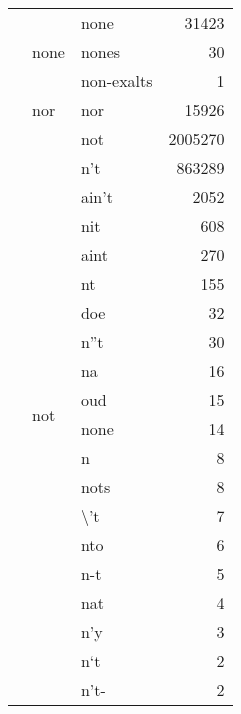 \begin{longtable}[ht]{lllr}
\cline{2-4}
 & \multirow[c]{3}{*}{none} & none & {\cellcolor[HTML]{FDFED4}} \color[HTML]{000000} 31423 \\
 &  & nones & {\cellcolor[HTML]{FFFFD9}} \color[HTML]{000000} 30 \\
 &  & non-exalts & {\cellcolor[HTML]{FFFFD9}} \color[HTML]{000000} 1 \\
\cline{2-4}
 & nor & nor & {\cellcolor[HTML]{FEFFD6}} \color[HTML]{000000} 15926 \\
\cline{2-4}
 & \multirow[c]{30}{*}{not} & not & {\cellcolor[HTML]{081D58}} \color[HTML]{F1F1F1} 2005270 \\
 &  & n't & {\cellcolor[HTML]{63C3BF}} \color[HTML]{000000} 863289 \\
 &  & ain't & {\cellcolor[HTML]{FFFFD9}} \color[HTML]{000000} 2052 \\
 &  & nit & {\cellcolor[HTML]{FFFFD9}} \color[HTML]{000000} 608 \\
 &  & aint & {\cellcolor[HTML]{FFFFD9}} \color[HTML]{000000} 270 \\
 &  & nt & {\cellcolor[HTML]{FFFFD9}} \color[HTML]{000000} 155 \\
 &  & doe & {\cellcolor[HTML]{FFFFD9}} \color[HTML]{000000} 32 \\
 &  & n''t & {\cellcolor[HTML]{FFFFD9}} \color[HTML]{000000} 30 \\
 &  & na & {\cellcolor[HTML]{FFFFD9}} \color[HTML]{000000} 16 \\
 &  & oud & {\cellcolor[HTML]{FFFFD9}} \color[HTML]{000000} 15 \\
 &  & none & {\cellcolor[HTML]{FFFFD9}} \color[HTML]{000000} 14 \\
 &  & n & {\cellcolor[HTML]{FFFFD9}} \color[HTML]{000000} 8 \\
 &  & nots & {\cellcolor[HTML]{FFFFD9}} \color[HTML]{000000} 8 \\
 &  & \textbackslash 't & {\cellcolor[HTML]{FFFFD9}} \color[HTML]{000000} 7 \\
 &  & nto & {\cellcolor[HTML]{FFFFD9}} \color[HTML]{000000} 6 \\
 &  & n-t & {\cellcolor[HTML]{FFFFD9}} \color[HTML]{000000} 5 \\
 &  & nat & {\cellcolor[HTML]{FFFFD9}} \color[HTML]{000000} 4 \\
 &  & n'y & {\cellcolor[HTML]{FFFFD9}} \color[HTML]{000000} 3 \\
 &  & n`t & {\cellcolor[HTML]{FFFFD9}} \color[HTML]{000000} 2 \\
 &  & n't- & {\cellcolor[HTML]{FFFFD9}} \color[HTML]{000000} 2 \\

\end{longtable}
